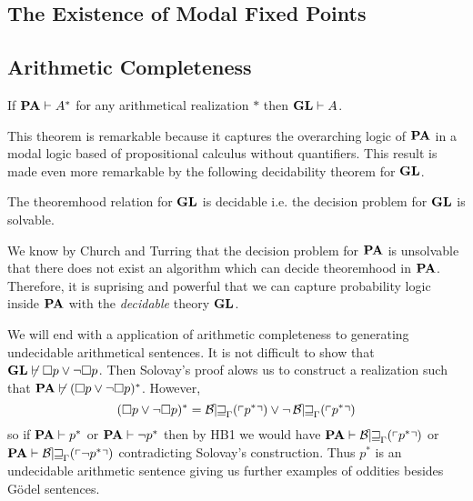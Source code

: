 \documentclass[12pt]{article}
\begin{document}
\subsection{The Existence of Modal Fixed Points}

\subsection{Arithmetic Completeness}

\begin{theorem}
If $\mathbf{PA} \vdash A^*$ for any arithmetical realization $*$ then $\mathbf{GL} \vdash A$.
\end{theorem}


\begin{remark}
This theorem is remarkable because it captures the overarching logic of $\mathbf{PA}$ in a modal logic based of propositional calculus without quantifiers. This result is made even more remarkable by the following decidability theorem for $\mathbf{GL}$.
\end{remark}

\begin{theorem}
The theoremhood relation for $\mathbf{GL}$ is decidable i.e. the decision problem for $\mathbf{GL}$ is solvable. 
\end{theorem}

\begin{remark}
We know by Church and Turring that the decision problem for $\mathbf{PA}$ is unsolvable that there does not exist an algorithm which can decide theoremhood in $\mathbf{PA}$. Therefore, it is suprising and powerful that we can capture probability logic inside $\mathbf{PA}$ with the \textit{decidable} theory $\mathbf{GL}$.
\end{remark}

\begin{remark}
We will end with a application of arithmetic completeness to generating undecidable arithmetical sentences. It is not difficult to show that $\mathbf{GL} \not\vdash \square p \vee \neg \square p$. Then Solovay's proof alows us to construct a realization such that $\mathbf{PA} \not\vdash (\square p \vee \neg \square p)^*$. However,
\[ (\square p \vee \neg \square p)^* = \operatorname{\mathcal{B\mkern-2.0mu e\mkern-2.0mu w\mkern-1mu}}_{\Gamma}(\left\ulcorner p^* \right\urcorner) \vee \neg \operatorname{\mathcal{B\mkern-2.0mu e\mkern-2.0mu w\mkern-1mu}}_{\Gamma}(\left\ulcorner p^* \right\urcorner) \]
so if $\mathbf{PA} \vdash p^*$ or $\mathbf{PA} \vdash \neg p^*$ then by HB1 we would have $\mathbf{PA} \vdash \operatorname{\mathcal{B\mkern-2.0mu e\mkern-2.0mu w\mkern-1mu}}_{\Gamma}(\left\ulcorner p^* \right\urcorner)$ or $\mathbf{PA} \vdash \operatorname{\mathcal{B\mkern-2.0mu e\mkern-2.0mu w\mkern-1mu}}_{\Gamma}(\left\ulcorner \neg p^* \right\urcorner)$ contradicting Solovay's construction. Thus $p^*$ is an undecidable arithmetic sentence giving us further examples of oddities besides G\"{o}del sentences.
\end{remark}
\end{document}
